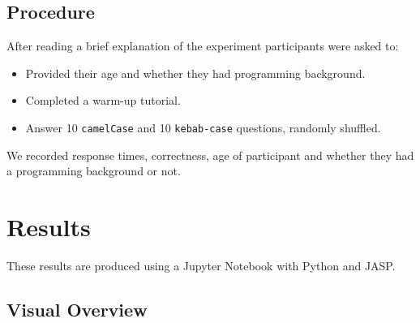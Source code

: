 \documentclass[unicode,11pt,a4paper,oneside,numbers=endperiod,openany]{scrartcl}
\begin{document}
\subsection{Procedure}
After reading a brief explanation of the experiment participants were asked to:
\begin{itemize}
    \item Provided their age and whether they had programming background.
    \item Completed a warm-up tutorial.
    \item Answer 10 \texttt{camelCase} and 10 \texttt{kebab-case} questions, randomly shuffled.
\end{itemize}

We recorded response times, correctness, age of participant and whether they had a programming background or not.

\section{Results}
These results are produced using a Jupyter Notebook with Python and JASP.

\subsection{Visual Overview}
\end{document}
